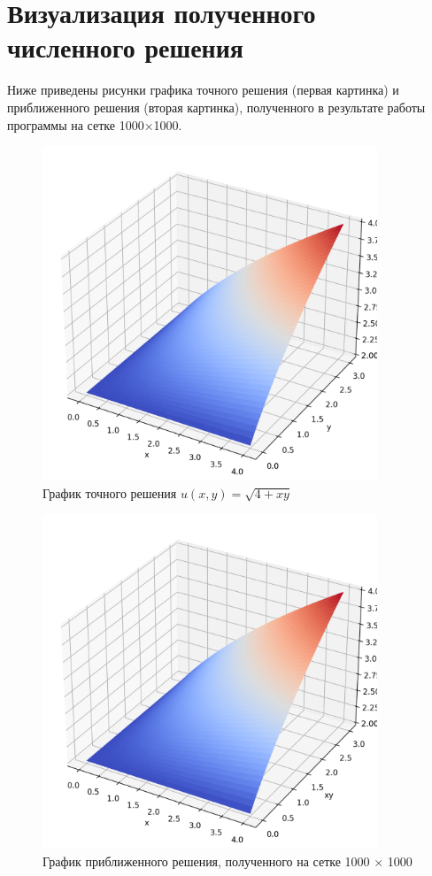 \documentclass{article}
\begin{document}
\newpage
\section{Визуализация полученного численного решения}
Ниже приведены рисунки графика точного решения (первая картинка) и приближенного решения (вторая картинка), полученного в результате работы программы на сетке 1000×1000.

\begin{figure}[!htp]
    \centering
    \includegraphics[width=10cm]{visualization_of_results_real.png}
    \caption{График точного решения $u(x,y) = \sqrt{4+xy}$}
    \label{fig:my_label}
\end{figure}

\begin{figure}[!htp]
    \centering
    \includegraphics[width=10cm]{visualization_of_results_approx.png}
    \caption{График приближенного решения, полученного на сетке 1000 $\times$ 1000}
    \label{fig:my_label}
\end{figure}
\end{document}
